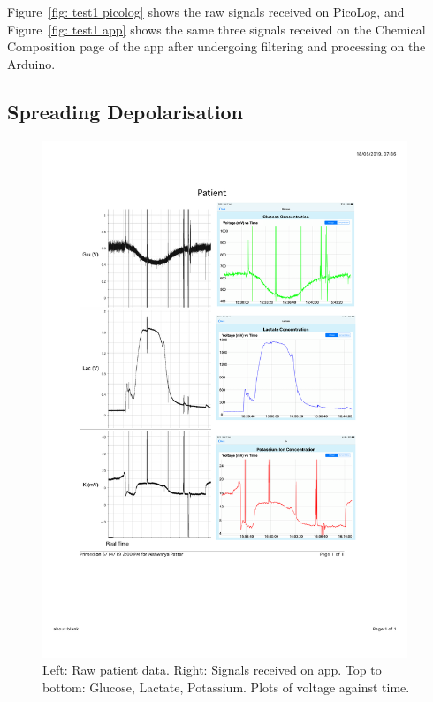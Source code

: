 Figure~\ref{fig: test1 picolog} shows the raw signals received on PicoLog, and Figure~\ref{fig: test1 app} shows the same three signals received on the Chemical Composition page of the app after undergoing filtering and processing on the Arduino.


\subsection{Spreading Depolarisation}

\begin{figure}[h!]
\centering
\includegraphics[trim={0cm 0cm 0cm  0cm}, clip, width=0.975\textwidth]{./figures/test2.pdf}
\captionsetup{justification=centering}
\caption{Left: Raw patient data. Right: Signals received on app. Top to bottom: Glucose, Lactate, Potassium. Plots of voltage against time.}
\label{fig: test2}
\end{figure}

